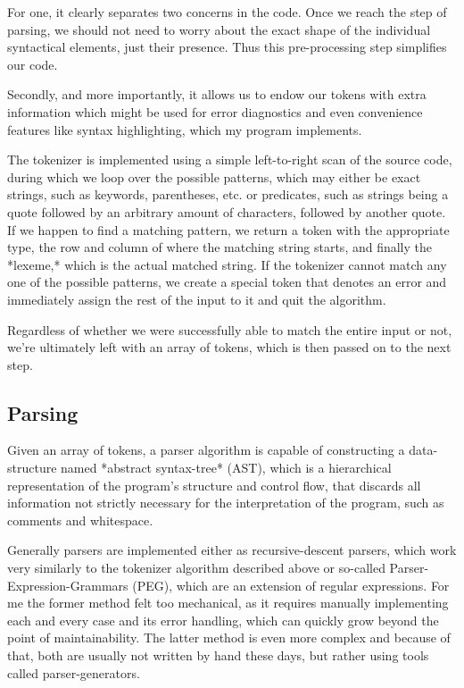 \documentclass[conference]{IEEEtran}
\begin{document}
For one, it clearly separates two concerns in the code. Once we reach the step of parsing, we should not need to worry about the exact shape of the individual syntactical elements, just their presence. Thus this pre-processing step simplifies our code.

Secondly, and more importantly, it allows us to endow our tokens with extra information which might be used for error diagnostics and even convenience features like syntax highlighting, which my program implements.

The tokenizer is implemented using a simple left-to-right scan of the source code, during which we loop over the possible patterns, which may either be exact strings, such as keywords, parentheses, etc. or predicates, such as strings being a quote followed by an arbitrary amount of characters, followed by another quote. If we happen to find a matching pattern, we return a token with the appropriate type, the row and column of where the matching string starts, and finally the *lexeme,* which is the actual matched string. If the tokenizer cannot match any one of the possible patterns, we create a special token that denotes an error and immediately assign the rest of the input to it and quit the algorithm.

Regardless of whether we were successfully able to match the entire input or not, we're ultimately left with an array of tokens, which is then passed on to the next step.

\subsection{Parsing}

Given an array of tokens, a parser algorithm is capable of constructing a data-structure named *abstract syntax-tree* (AST), which is a hierarchical representation of the program's structure and control flow, that discards all information not strictly necessary for the interpretation of the program, such as comments and whitespace.

Generally parsers are implemented either as recursive-descent parsers, which work very similarly to the tokenizer algorithm described above or so-called Parser-Expression-Grammars (PEG), which are an extension of regular expressions. For me the former method felt too mechanical, as it requires manually implementing each and every case and its error handling, which can quickly grow beyond the point of maintainability. The latter method is even more complex and because of that, both are usually not written by hand these days, but rather using tools called parser-generators.
\end{document}
